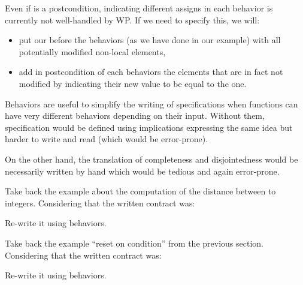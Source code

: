 \begin{Warning}
  Even if  is a postcondition, indicating different assigns
  in each behavior is currently not well-handled by WP. If we need to specify
  this, we will:
  \begin{itemize}
  \item put our  before the behaviors (as we have done in our
    example) with all potentially modified non-local elements,
  \item add in postcondition of each behaviors the elements that are in fact
    not modified by indicating their new value to be equal to the
     one.
  \end{itemize}
\end{Warning}


Behaviors are useful to simplify the writing of specifications when
functions can have very different behaviors depending on their input.
Without them, specification would be defined using implications
expressing the same idea but harder to write and read (which would be
error-prone).



On the other hand, the translation of completeness and disjointedness
would be necessarily written by hand which would be tedious and again
error-prone.








Take back the example about the computation of the distance between to
integers. Considering that the written contract was:




Re-write it using behaviors.






Take back the example ``reset on condition'' from the previous section.
Considering that the written contract was:






Re-write it using behaviors.





